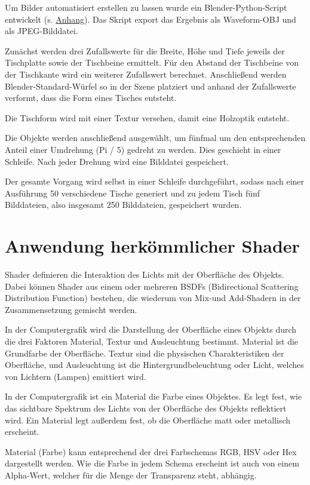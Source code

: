 Um Bilder automatisiert erstellen zu lassen wurde ein Blender-Python-Script entwickelt (s. \hyperref[blenderpy]{Anhang}). Das Skript export das Ergebnis als Waveform-OBJ und als JPEG-Bilddatei.

Zunächst werden drei Zufallswerte für die Breite, Höhe und Tiefe jeweils der Tischplatte sowie der Tischbeine ermittelt. Für den Abstand der Tischbeine von der Tischkante wird ein weiterer Zufallswert berechnet. Anschließend werden Blender-Standard-Würfel so in der Szene platziert und anhand der Zufallswerte verformt, dass die Form eines Tisches entsteht.

Die Tischform wird mit einer Textur versehen, damit eine Holzoptik entsteht.

Die Objekte werden anschließend ausgewählt, um fünfmal um den entsprechenden Anteil einer Umdrehung (Pi / 5) gedreht zu werden. Dies geschieht in einer Schleife. Nach jeder Drehung wird eine Bilddatei gespeichert.

Der gesamte Vorgang wird selbst in einer Schleife durchgeführt, sodass nach einer Ausführung 50 verschiedene Tische generiert und zu jedem Tisch fünf Bilddateien, also insgesamt 250 Bilddateien, gespeichert wurden.


\section{Anwendung herkömmlicher Shader}
\label{sec:shader}
Shader definieren die Interaktion des Lichts mit der Oberfläche des Objekts. Dabei können Shader aus einem oder mehreren BSDFs (Bidirectional Scattering Distribution Function) bestehen, die wiederum von Mix-und Add-Shadern in der Zusammensetzung gemischt werden. \cite{wartmann2014blender}

In der Computergrafik wird die Darstellung der Oberfläche eines Objekts durch die drei Faktoren Material, Textur und Ausleuchtung bestimmt. Material ist die Grundfarbe der Oberfläche. Textur sind die physischen Charakteristiken der Oberfläche, und Ausleuchtung ist die Hintergrundbeleuchtung oder Licht, welches von Lichtern (Lampen) emittiert wird. \cite{blain2020blender}

In der Computergrafik ist ein Material die Farbe eines Objektes. Es legt fest, wie das sichtbare Spektrum des Lichts von der Oberfläche des Objekts reflektiert wird. Ein Material legt außerdem fest, ob die Oberfläche matt oder metallisch erscheint. \cite{blain2020blender}

Material (Farbe) kann entsprechend der drei Farbschemas RGB, HSV oder Hex dargestellt werden. Wie die Farbe in jedem Schema erscheint ist auch von einem Alpha-Wert, welcher für die Menge der Transparenz steht, abhängig. \cite{blain2020blender}

